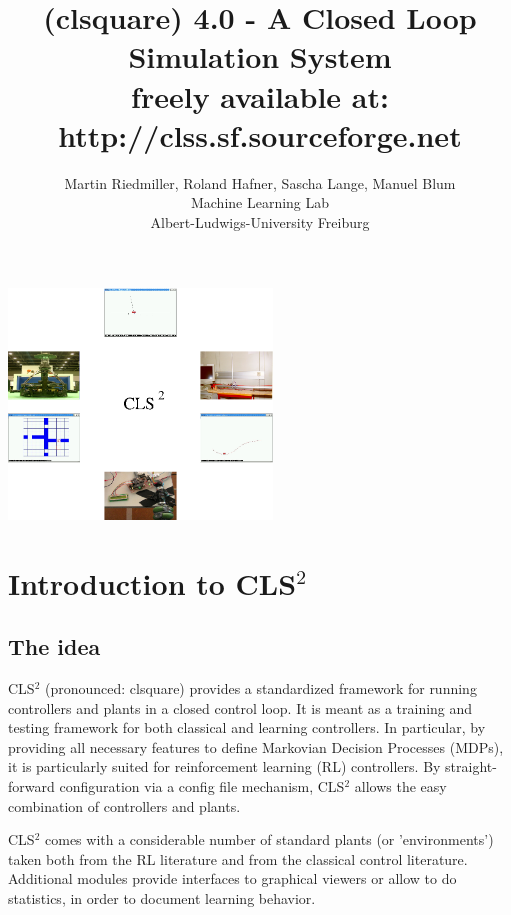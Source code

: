 \documentclass[a4paper,12pt,german]{article}
\newcommand{\cls}{{CLS$^2$ }}
\begin{document}
\title{\vspace*{-5cm}\cls (clsquare) 4.0 - A Closed Loop Simulation System\\
{\normalsize freely available at: http://clss.sf.sourceforge.net}}
\author{Martin Riedmiller, Roland Hafner, Sascha Lange, Manuel Blum\\Machine Learning Lab\\
Albert-Ludwigs-University Freiburg}



\maketitle

\centerline{\includegraphics[width=7cm]{clslogo}}


\newpage

\section{Introduction to \cls}

\subsection{The idea}

\cls (pronounced: clsquare)  provides a standardized framework for running
controllers and plants in a closed control loop. It is meant as a
training and testing framework for both classical and learning controllers.
In particular, by providing all necessary features to define Markovian Decision
Processes (MDPs), it is particularly suited for reinforcement learning (RL)
controllers. By straight-forward configuration via a config file mechanism, 
\cls allows the easy combination of controllers and plants.

\cls comes with a considerable number of standard plants (or
'environments') taken both from the RL literature and from the
classical control literature. Additional modules provide interfaces to
graphical viewers or allow to do statistics, in order to document
learning behavior.
 
\end{document}
